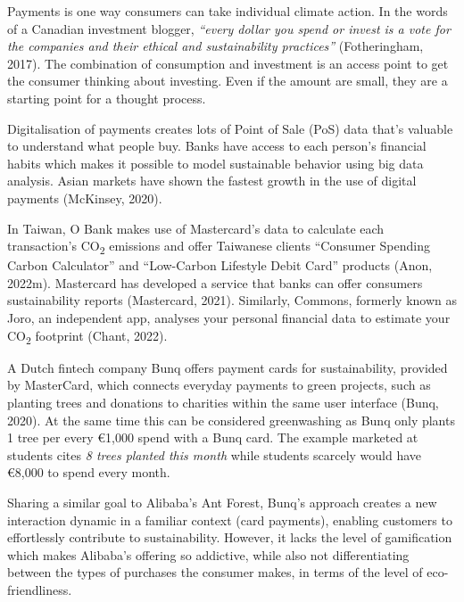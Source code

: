 \documentclass[
  letterpaper,
  DIV=11,
  numbers=noendperiod]{scrartcl}
\begin{document}
Payments is one way consumers can take individual climate action. In the
words of a Canadian investment blogger, \emph{``every dollar you spend
or invest is a vote for the companies and their ethical and
sustainability practices''} (Fotheringham, 2017). The combination of
consumption and investment is an access point to get the consumer
thinking about investing. Even if the amount are small, they are a
starting point for a thought process.

Digitalisation of payments creates lots of Point of Sale (PoS) data
that's valuable to understand what people buy. Banks have access to each
person's financial habits which makes it possible to model sustainable
behavior using big data analysis. Asian markets have shown the fastest
growth in the use of digital payments (McKinsey, 2020).

In Taiwan, O Bank makes use of Mastercard's data to calculate each
transaction's CO\textsubscript{2} emissions and offer Taiwanese clients
``Consumer Spending Carbon Calculator'' and ``Low-Carbon Lifestyle Debit
Card'' products (Anon, 2022m). Mastercard has developed a service that
banks can offer consumers sustainability reports (Mastercard, 2021).
Similarly, Commons, formerly known as Joro, an independent app, analyses
your personal financial data to estimate your CO\textsubscript{2}
footprint (Chant, 2022).

A Dutch fintech company Bunq offers payment cards for sustainability,
provided by MasterCard, which connects everyday payments to green
projects, such as planting trees and donations to charities within the
same user interface (Bunq, 2020). At the same time this can be
considered greenwashing as Bunq only plants 1 tree per every €1,000
spend with a Bunq card. The example marketed at students cites \emph{8
trees planted this month} while students scarcely would have €8,000 to
spend every month.

Sharing a similar goal to Alibaba's Ant Forest, Bunq's approach creates
a new interaction dynamic in a familiar context (card payments),
enabling customers to effortlessly contribute to sustainability.
However, it lacks the level of gamification which makes Alibaba's
offering so addictive, while also not differentiating between the types
of purchases the consumer makes, in terms of the level of
eco-friendliness.
\end{document}
